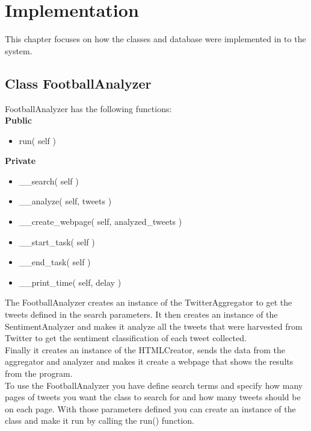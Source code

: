 \chapter[Implementation]{Implementation}
\label{chap:Implementation}

This chapter focuses on how the classes and database were implemented in to the system.

\section{Class FootballAnalyzer} \label{sec:FootballAnalyzerImplementation}
FootballAnalyzer has the following functions:\\

{\bf Public}
\begin{itemize}
\item run( self )
\end{itemize}

{\bf Private}
\begin{itemize}
\item \_\_search( self )
\item \_\_analyze( self, tweets )
\item \_\_create\_webpage( self, analyzed\_tweets )
\item \_\_start\_task( self )
\item \_\_end\_task( self )
\item \_\_print\_time( self, delay )
\end{itemize}

The FootballAnalyzer creates an instance of the TwitterAggregator to get the tweets defined in the search parameters. It then creates an instance of the SentimentAnalyzer and makes it analyze all the tweets that were harvested from Twitter to get the sentiment classification of each tweet collected. \\

Finally it creates an instance of the HTMLCreator, sends the data from the aggregator and analyzer and makes it create a webpage that shows the results from the program.\\

To use the FootballAnalyzer you have define search terms and specify how many pages of tweets you want the class to search for and how many tweets should be on each page. With those parameters defined you can create an instance of the class and make it run by calling the run() function.\\

